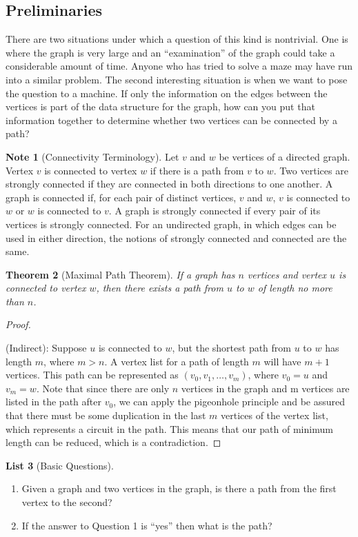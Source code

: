 \documentclass[10pt,]{book}
\theoremstyle{plain}
\newtheorem{theorem}{Theorem}[section]
\theoremstyle{definition}
\theoremstyle{definition}
\newtheorem{note}[theorem]{Note}
\theoremstyle{definition}
\theoremstyle{definition}
\theoremstyle{definition}
\newtheorem{listwrapper}[theorem]{List}
\numberwithin{equation}{section}
\begin{document}
\subsection[Preliminaries]{Preliminaries}\label{ss-connectivity-prelim}
There are two situations under which a question of this kind is nontrivial. One is where the graph is very large and an ``examination'' of the
graph could take a considerable amount of time. Anyone who has tried to solve a maze may have run into a similar problem. The second interesting
situation is when we want to pose the question to a machine. If only the information on the edges between the vertices is part of the data structure
for the graph, how can you put that information together to determine whether two vertices can be connected by a path?%
\begin{note}[Connectivity Terminology]\label{note-3}
 Let \(v\) and \(w\) be vertices of a directed graph. Vertex \(v\) is  connected to vertex
\(w\) if there is a path from \(v\) to \(w\). Two vertices are  strongly connected if they are connected in both directions
to one another. A  graph is connected if, for each pair of distinct vertices, \(v\) and \(w\), \(v\) is connected to \(w\)  or \(w\) is connected to \(v\). A  graph is strongly connected if every pair of its vertices is strongly connected. For an
undirected graph, in which edges can be used in either direction, the notions of strongly connected and connected are the same.%
\end{note}
\begin{theorem}[Maximal Path Theorem]\label{theorem-9.3.1}
If a graph has \(n\) vertices and vertex \(u\) is connected to vertex \(w\), then there exists a path from \(u\) to \(w\) of length no more than
\(n\).%
\end{theorem}
\begin{proof}\hypertarget{proof-1}{}
(Indirect): Suppose \(u\) is connected to \(w\), but the shortest path from \(u\) to \(w\) has length \(m\), where \(m>n\). A vertex list for a path of length \(m\) will have \(m + 1\) vertices. This path can be represented as \(\left(v_0,v_1,\ldots, v_m\right)\), where \(v_0=u\) and \(v_m= w\). Note that since there are only \(n\) vertices in the graph and m vertices are listed in the path after \(v_0\), we can apply the pigeonhole principle and be assured that there must be some duplication in the last \(m\) vertices of the vertex list, which represents a circuit in the path. This means that our path of minimum length can be reduced, which is a contradiction.%
\end{proof}
\begin{listwrapper}[Basic Questions]\label{list-3}
\leavevmode%
\begin{enumerate}
\item\hypertarget{li-32}{}Given a graph and two vertices in the graph, is there a path from the first vertex to the second?%
\item\hypertarget{li-33}{}If the answer to Question 1 is ``yes'' then what is the path?%
\end{enumerate}
\end{listwrapper}
\typeout{************************************************}
\typeout{************************************************}
\end{document}
